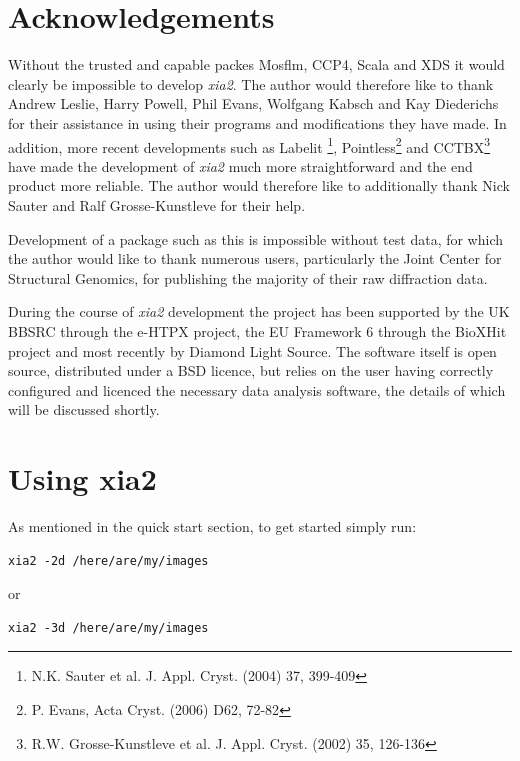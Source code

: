 \documentclass[a4paper, 11pt]{article}
\begin{document}
\section{Acknowledgements}

Without the trusted and capable packes Mosflm, CCP4, Scala and XDS it would 
clearly be impossible to develop \emph{xia2}. The author would therefore
like to thank Andrew Leslie, Harry Powell, Phil Evans, Wolfgang Kabsch 
and Kay Diederichs for their assistance in using their programs and 
modifications they have made. In addition, more recent developments
such as Labelit \footnote{N.K. Sauter et al. J. Appl. Cryst. (2004) 37, 
399-409}, Pointless\footnote{P. Evans, Acta Cryst. (2006) D62, 72-82}
and CCTBX\footnote{R.W. Grosse-Kunstleve et al. J. Appl. Cryst. (2002) 35, 
126-136} have made the development of \emph{xia2} much more straightforward
and the end product more reliable. The author would therefore like to
additionally thank Nick Sauter and Ralf Grosse-Kunstleve for their help.

Development of a package such as this is impossible without test data, for
which the author would like to thank numerous users, particularly the 
Joint Center for Structural Genomics, for publishing the majority of their
raw diffraction data. 

During the course of \emph{xia2} development the project has been 
supported by the UK BBSRC through the e-HTPX project, the EU Framework 6
through the BioXHit project and most recently by Diamond Light Source.
The software itself is open source, distributed under a BSD licence, but 
relies on the user having correctly configured and licenced the necessary
data analysis software, the details of which will be discussed shortly.

\clearpage

\section{Using xia2}

As mentioned in the quick start section, to get started simply run:

\begin{verbatim}
xia2 -2d /here/are/my/images
\end{verbatim}

\noindent
or

\begin{verbatim}
xia2 -3d /here/are/my/images
\end{verbatim}
\end{document}
